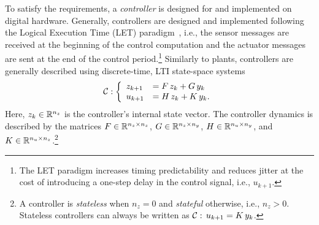 To satisfy the requirements, a \emph{controller} is designed for and implemented on digital hardware.
Generally, controllers are designed and implemented following the Logical Execution Time (LET) paradigm~\cite{Henzinger:2003}, i.e., the sensor messages are received at the beginning of the control computation and the actuator messages are sent at the end of the control period.\footnote{The LET paradigm increases timing predictability and reduces jitter at the cost of introducing a one-step delay in the control signal, i.e., $u_{k+1}$.}
Similarly to plants, controllers are generally described using discrete-time, LTI state-space systems
%
\begin{equation}
    \label{eq:ctrler} 
    \ctrler: \left\{\begin{array}{ll}
        z_{k+1} &= \Ac\,z_k+\Bc\,y_k\\
        u_{k+1} &= \Cc\,z_k+\Dc\,y_k.
    \end{array}\right.
\end{equation}
%
Here, $z_k \in \mathbb{R}^{n_z}$ is the controller's internal state vector.
The controller dynamics is described by the matrices $F \in \mathbb{R}^{n_z \times n_z}$, $G \in \mathbb{R}^{n_z \times n_y}$, $H \in \mathbb{R}^{n_u \times n_y}$, and $K \in \mathbb{R}^{n_u \times n_z}$.\footnote{A controller is \emph{stateless} when $n_z=0$ and \emph{stateful} otherwise, i.e., $n_z > 0$. Stateless controllers can always be written as $\mathcal{C}:\, u_{k+1} = K\,y_k$.}

